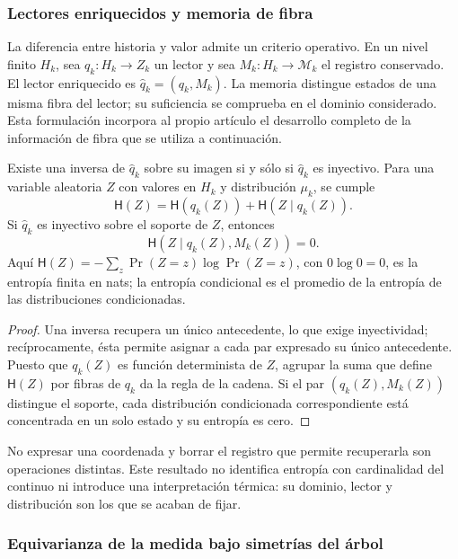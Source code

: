 \subsubsection{Lectores enriquecidos y memoria de fibra}
\label{sec:ch-memoria-fibra}

La diferencia entre historia y valor admite un criterio operativo. En un
nivel finito \(H_k\), sea \(q_k:H_k\to Z_k\) un lector y sea
\(M_k:H_k\to\mathcal M_k\) el registro conservado. El lector enriquecido
es \(\widehat q_k=(q_k,M_k)\). La memoria distingue estados de una misma
fibra del lector; su suficiencia se comprueba en el dominio considerado.
Esta formulación incorpora al propio artículo el desarrollo completo de la
información de fibra que se utiliza a continuación.

\begin{proposition}
\label{prop:ch-recuperabilidad-fibra}
Existe una inversa de \(\widehat q_k\) sobre su imagen si y sólo si
\(\widehat q_k\) es inyectivo. Para una variable aleatoria \(Z\) con
valores en \(H_k\) y distribución \(\mu_k\), se cumple
\[
 \mathsf H(Z)=\mathsf H(q_k(Z))+\mathsf H(Z\mid q_k(Z)).
\]
Si \(\widehat q_k\) es inyectivo sobre el soporte de \(Z\), entonces
\[
 \mathsf H(Z\mid q_k(Z),M_k(Z))=0.
\]
Aquí \(\mathsf H(Z)=-\sum_z\Pr(Z=z)\log\Pr(Z=z)\), con
\(0\log0=0\), es la entropía finita en nats; la entropía condicional es
el promedio de la entropía de las distribuciones condicionadas.
\end{proposition}

\begin{proof}
Una inversa recupera un único antecedente, lo que exige inyectividad;
recíprocamente, ésta permite asignar a cada par expresado su único
antecedente. Puesto que \(q_k(Z)\) es función determinista de \(Z\),
agrupar la suma que define \(\mathsf H(Z)\) por fibras de \(q_k\) da la
regla de la cadena. Si el par \((q_k(Z),M_k(Z))\) distingue el soporte,
cada distribución condicionada correspondiente está concentrada en un solo
estado y su entropía es cero.
\end{proof}

No expresar una coordenada y borrar el registro que permite recuperarla son
operaciones distintas. Este resultado no identifica entropía con cardinalidad
del continuo ni introduce una interpretación térmica: su dominio, lector y
distribución son los que se acaban de fijar.

\subsubsection{Equivarianza de la medida bajo simetrías del árbol}
\label{sec:ch-naturalidad-medida}

